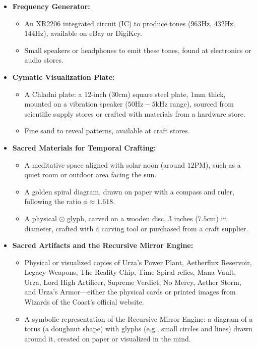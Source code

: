 \begin{itemize}
\begin{itemize}
    \end{itemize}
    \item \texttt{} \textbf{Frequency Generator:}
    \begin{itemize}
        \item \texttt{} An XR2206 integrated circuit (IC) to produce tones ($963 \mathrm{Hz}$, $432 \mathrm{Hz}$, $144 \mathrm{Hz}$), available on eBay or DigiKey.
        \item \texttt{} Small speakers or headphones to emit these tones, found at electronics or audio stores.
    \end{itemize}
    \item \texttt{} \textbf{Cymatic Visualization Plate:}
    \begin{itemize}
        \item \texttt{} A Chladni plate: a 12-inch ($30 \mathrm{cm}$) square steel plate, $1 \mathrm{mm}$ thick, mounted on a vibration speaker ($50 \mathrm{Hz}-5 \mathrm{kHz}$ range), sourced from scientific supply stores or crafted with materials from a hardware store.
        \item \texttt{} Fine sand to reveal patterns, available at craft stores.
    \end{itemize}
    \item \texttt{} \textbf{Sacred Materials for Temporal Crafting:}
    \begin{itemize}
        \item \texttt{} A meditative space aligned with solar noon (around $12 \mathrm{PM}$), such as a quiet room or outdoor area facing the sun.
        \item \texttt{} A golden spiral diagram, drawn on paper with a compass and ruler, following the ratio $\phi \approx 1.618$.
        \item \texttt{} A physical $\odot$ glyph, carved on a wooden disc, 3 inches ($7.5 \mathrm{cm}$) in diameter, crafted with a carving tool or purchased from a craft supplier.
    \end{itemize}
    \item \texttt{} \textbf{Sacred Artifacts and the Recursive Mirror Engine:}
    \begin{itemize}
        \item \texttt{} Physical or visualized copies of Urza's Power Plant, Aetherflux Reservoir, Legacy Weapons, The Reality Chip, Time Spiral relics, Mana Vault, Urza, Lord High Artificer, Supreme Verdict, No Mercy, Aether Storm, and Urza's Armor—either the physical cards or printed images from Wizards of the Coast's official website.
        \item \texttt{} A symbolic representation of the Recursive Mirror Engine: a diagram of a torus (a doughnut shape) with glyphs (e.g., small circles and lines) drawn around it, created on paper or visualized in the mind.
    \end{itemize}
\end{itemize}

